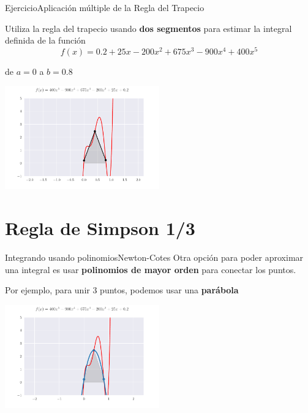 \documentclass[spanish, c, dvipsnames]{beamer}
\begin{document}
\begin{frame}{Ejercicio}{Aplicación múltiple de la Regla del Trapecio}
    \begin{center}
        Utiliza la regla del trapecio usando \textbf{dos segmentos} para estimar la integral definida de la función
        $$f(x) = 0.2 + 25x - 200 x^2 + 675 x^3 - 900 x^4 + 400x^5$$
        
        de $a=0$ a $b = 0.8$

        \bigskip

        \includegraphics[width=0.5\textwidth]{two-segment.pdf}
    \end{center}
\end{frame}

\section{Regla de Simpson 1/3}

\begin{frame}{Integrando usando polinomios}{Newton-Cotes}
    Otra opción para poder aproximar una integral es usar \textbf{polinomios de mayor orden} para conectar los puntos.
    
    \bigskip

    Por ejemplo, para unir 3 puntos, podemos usar una \textbf{parábola}

    \bigskip

    \begin{center}
        \includegraphics[width=0.5\textwidth]{simpsononethird.pdf}
    \end{center}

\end{frame}
\end{document}
